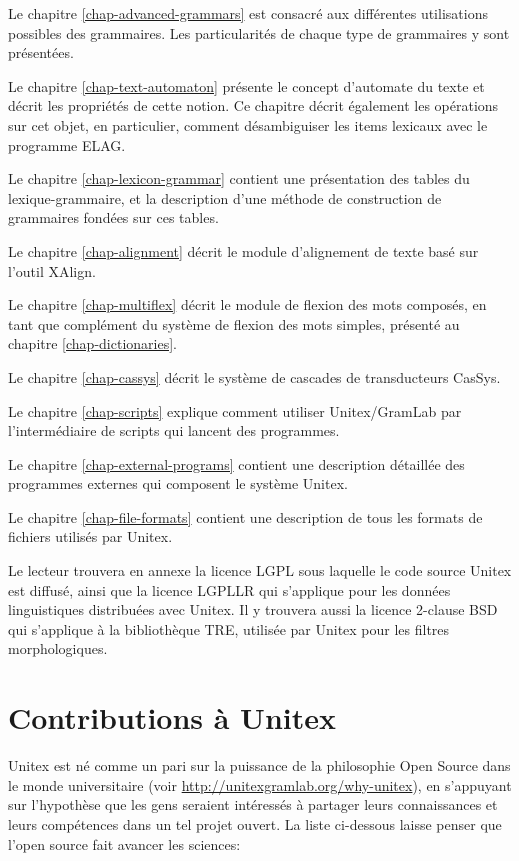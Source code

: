 \bigskip \noindent Le chapitre \ref{chap-advanced-grammars} est consacré aux différentes
utilisations possibles des grammaires. Les particularités de chaque type de grammaires y sont
présentées.

\bigskip \noindent Le chapitre \ref{chap-text-automaton} présente le concept d'automate du texte 
et décrit les propriétés de cette notion. Ce chapitre  décrit également les opérations sur cet
objet, en particulier, comment désambiguiser les items lexicaux avec le programme ELAG.

\bigskip \noindent Le chapitre \ref{chap-lexicon-grammar} contient une présentation des tables du
lexique-grammaire, et la description d'une méthode de construction de  grammaires fondées sur ces
tables.

\bigskip \noindent Le chapitre \ref{chap-alignment} décrit le module d'alignement de texte basé sur
l'outil XAlign.

\bigskip \noindent Le chapitre \ref{chap-multiflex} décrit le module de flexion des mots composés,
en tant que complément du système de flexion des mots simples, présenté au chapitre
\ref{chap-dictionaries}.

\bigskip \noindent Le chapitre \ref{chap-cassys} décrit le système de cascades de transducteurs
CasSys.

\bigskip \noindent Le chapitre \ref{chap-scripts} explique comment utiliser Unitex/GramLab
par l'intermédiaire de scripts qui lancent des programmes.

\bigskip \noindent Le chapitre \ref{chap-external-programs} contient une description détaillée des
programmes externes qui composent le système Unitex.

\bigskip \noindent Le chapitre \ref{chap-file-formats} contient une description de tous les formats
de fichiers utilisés par Unitex.


\bigskip \noindent Le lecteur trouvera en annexe la licence LGPL sous  laquelle le code source
Unitex est diffusé, ainsi que la licence LGPLLR qui s'applique pour les données linguistiques
distribuées avec Unitex. Il y trouvera aussi la licence 2-clause BSD qui s'applique à la
bibliothèque TRE, utilisée par Unitex pour les filtres morphologiques.


\section*{Contributions à Unitex}
Unitex est né comme un pari sur la puissance de la philosophie Open Source dans le monde
universitaire (voir \url{http://unitexgramlab.org/why-unitex}), en s'appuyant sur l'hypothèse que les gens seraient intéressés à partager leurs connaissances et leurs compétences dans un tel projet ouvert.
La liste ci-dessous laisse penser que l'open source fait avancer les sciences:

